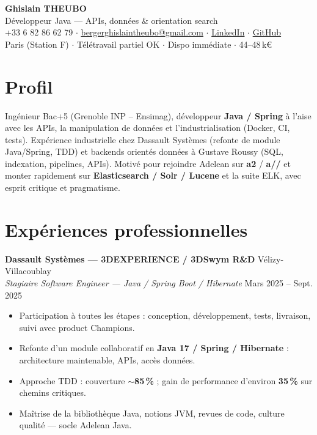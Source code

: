 \documentclass[10pt,a4paper]{article}
\begin{document}
\begin{center}
{\LARGE\bfseries Ghislain THEUBO}\\[2pt]
{\large D\'eveloppeur Java --- APIs, donn\'ees \& orientation search}\\[3pt]
+33 6 82 86 62 79 $\cdot$
\href{mailto:bergerghislaintheubo@gmail.com}{bergerghislaintheubo@gmail.com} $\cdot$
\href{https://www.linkedin.com/in/berger-ghislain}{LinkedIn} $\cdot$
\href{https://github.com/Bergerghislain}{GitHub}\\[1pt]
Paris (Station F) $\cdot$ T\'el\'etravail partiel OK $\cdot$ Dispo imm\'ediate $\cdot$ 44--48\,k€
\end{center}

\section{Profil}
Ing\'enieur Bac+5 (Grenoble INP -- Ensimag), d\'eveloppeur \textbf{Java / Spring} \`a l'aise avec les APIs, la manipulation de donn\'ees et l'industrialisation (Docker, CI, tests). Exp\'erience industrielle chez Dassault Syst\`emes (refonte de module Java/Spring, TDD) et backends orient\'es donn\'ees \`a Gustave Roussy (SQL, indexation, pipelines, APIs). Motiv\'e pour rejoindre Adelean sur \textbf{a2} / \textbf{a//} et monter rapidement sur \textbf{Elasticsearch / Solr / Lucene} et la suite ELK, avec esprit critique et pragmatisme.

\section{Exp\'eriences professionnelles}
\textbf{Dassault Syst\`emes --- 3DEXPERIENCE / 3DSwym R\&D} \hfill V\'elizy-Villacoublay\\
\textit{Stagiaire Software Engineer --- Java / Spring Boot / Hibernate} \hfill Mars 2025 -- Sept. 2025
\begin{itemize}
  \item Participation \`a toutes les \'etapes : conception, d\'eveloppement, tests, livraison, suivi avec product Champions.
  \item Refonte d'un module collaboratif en \textbf{Java 17 / Spring / Hibernate} : architecture maintenable, APIs, acc\`es donn\'ees.
  \item Approche TDD : couverture $\sim$\textbf{85\,\%} ; gain de performance d'environ \textbf{35\,\%} sur chemins critiques.
  \item Ma\^itrise de la biblioth\`eque Java, notions JVM, revues de code, culture qualit\'e --- socle Adelean Java.
\end{itemize}
\end{document}
